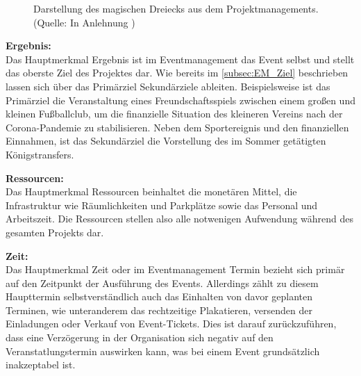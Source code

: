 \begin{figure}[H]
    \centering
    \setlength{\fboxsep}{10pt}
    \setlength{\fboxrule}{0.5pt}
    \caption[Eventmanagement: magisches Dreieck]{Darstellung des magischen Dreiecks aus dem Projektmanagements. (Quelle: In Anlehnung \autocite[]{Holzbaur.2002})} \label{fig:EM_magisches_Dreieck}
\end{figure}

\textbf{Ergebnis:} 
\\
Das Hauptmerkmal Ergebnis ist im Eventmanagement das Event selbst und stellt das oberste Ziel des Projektes dar.
Wie bereits im \autoref{subsec:EM_Ziel} beschrieben lassen sich über das Primärziel Sekundärziele ableiten.
Beispielsweise ist das Primärziel die Veranstaltung eines Freundschaftsspiels zwischen einem großen und kleinen Fußballclub, um die finanzielle Situation des kleineren Vereins nach der Corona-Pandemie zu stabilisieren.
Neben dem Sportereignis und den finanziellen Einnahmen, ist das Sekundärziel die Vorstellung des im Sommer getätigten Königstransfers.

\textbf{Ressourcen:}
\\
Das Hauptmerkmal Ressourcen beinhaltet die monetären Mittel, die Infrastruktur wie Räumlichkeiten und Parkplätze sowie das Personal und Arbeitszeit.
Die Ressourcen stellen also alle notwenigen Aufwendung während des gesamten Projekts dar.

\textbf{Zeit:}
\\
Das Hauptmerkmal Zeit oder im Eventmanagement Termin bezieht sich primär auf den Zeitpunkt der Ausführung des Events.
Allerdings zählt zu diesem Haupttermin selbstverständlich auch das Einhalten von davor geplanten Terminen, wie unteranderem das rechtzeitige Plakatieren, versenden der Einladungen oder Verkauf von Event-Tickets.
Dies ist darauf zurückzuführen, dass eine Verzögerung in der Organisation sich negativ auf den Veranstatlungstermin auswirken kann, was bei einem Event grundsätzlich inakzeptabel ist.

